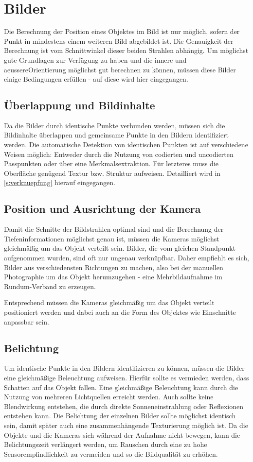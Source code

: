 \documentclass[./00PhotoBox.tex]{subfiles}
\begin{document}
\section{Bilder}
\label{s:bilder}

Die Berechnung der Position eines Objektes im Bild ist nur möglich, sofern der Punkt in mindestens einem weiteren Bild abgebildet ist. Die Genauigkeit der Berechnung ist vom Schnittwinkel dieser beiden Strahlen abhängig. Um möglichst gute Grundlagen zur Ver\-fügung zu haben und die innere und \gls{aeussereOrientierung} möglichst gut berechnen zu können, müssen diese Bilder einige Bedingungen erfüllen - auf diese wird hier eingegangen.

\subsection{Überlappung und Bildinhalte}
Da die Bilder durch identische Punkte verbunden werden, müssen sich die Bildinhalte überlappen und gemeinsame Punkte in den Bildern identifiziert werden. Die automatische Detektion von identischen Punkten ist auf verschiedene Weisen möglich: Entweder durch die Nutzung von codierten und uncodierten Passpunkten oder über eine Merkmalsextraktion. Für letzteres muss die Oberfläche genügend Textur bzw. Struktur aufweisen. Detailliert wird in \autoref{s:verknuepfung} hierauf eingegangen. \citep[vgl.][S. 478]{luhmann}

\subsection{Position und Ausrichtung der Kamera}
Damit die Schnitte der Bildstrahlen optimal sind und die Berechnung der Tiefeninformationen möglichst genau ist, müssen die Kameras möglichst gleichmäßig um das Objekt verteilt sein.
Bilder, die vom gleichen Standpunkt aufgenommen wurden, sind oft nur ungenau verknüpfbar. Daher empfiehlt es sich, Bilder aus verschiedensten Richtungen zu machen, also bei der manuellen Photographie um das Objekt herumzugehen - eine Mehrbildaufnahme im Rundum-Verband zu erzeugen. \citep[vgl.][S. 170]{luhmann}

Entsprechend müssen die Kameras gleichmäßig um das Objekt verteilt positioniert werden und dabei auch an die Form des Objektes wie Einschnitte anpassbar sein.

\subsection{Belichtung}
Um identische Punkte in den Bildern identifizieren zu können, müssen die Bilder eine gleichmäßige Beleuchtung aufweisen. Hierfür sollte es vermieden werden, dass Schatten auf das Objekt fallen. Eine gleichmäßige Beleuchtung kann durch die Nutzung von mehreren Lichtquellen erreicht werden. Auch sollte keine Blendwirkung entstehen, die durch direkte Sonneneinstrahlung oder Reflexionen entstehen kann. Die Belichtung der einzelnen Bilder sollte möglichst identisch sein, damit später auch eine zusammenhängende Texturierung möglich ist.
Da die Objekte und die Kameras sich während der Aufnahme nicht bewegen, kann die Belichtungszeit verlängert werden, um Rauschen durch eine zu hohe Sensorempfindlichkeit zu vermeiden und so die Bildqualität zu erhöhen.
\end{document}
